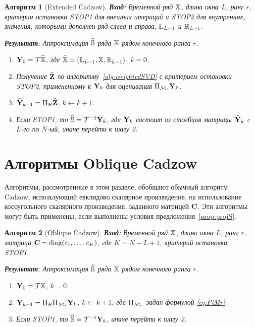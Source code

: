 \documentclass[12pt, specialist, subf,href,colorlinks=true,substylefile = spbu.rtx]{disser}
\newtheorem{algorithm}{Алгоритм}
\theoremstyle{remark}
\theoremstyle{definition}
\begin{document}
\begin{algorithm}[Extended Cadzow] \label{alg:ECIt}
\textbf{Вход}: Временной ряд $\mathbb{X}$, длина окна $L$, ранг $r$,
критерии остановки STOP1 для внешних итераций и STOP2 для внутренних,
значения, которыми дополнен ряд слева и справа, $\mathbb{L}_{L-1}$ и $\mathbb{R}_{L-1}$.

\textbf{Результат}:
Аппроксимация $\widehat{\mathbb{S}}$ ряда $\mathbb{X}$ рядом конечного ранга $r$.

\begin{enumerate}
\item
$\mathbf{Y}_0 = \mathcal{T} \widetilde{\mathbb{X}}$, где $\widetilde{\mathbb{X}}=(\mathbb{L}_{L-1}, \mathbb{X}, \mathbb{R}_{L-1})$, $k=0$.
\item
Получение $\widehat{\mathbf{Z}}$ по алгоритму~\ref{alg:weightedSVD} с критерием остановки STOP2, примененному к $\mathbf{Y}_k$ для оценивания $\Pi_{\mathcal{M}_r} \mathbf{Y}_{k}$.
\item
$\widetilde{\mathbf{Y}}_{k+1} = \Pi_{\mathcal{H}}  \widehat{\mathbf{Z}}$, $k\leftarrow k+1$.
\item
Если STOP1, то $\widehat{\mathbb{S}} = \mathcal{T}^{-1} \mathbf{Y}_k$, где $\mathbf{Y}_k$ состоит из столбцов матрицы $\widetilde{\mathbf{Y}}_{k}$
c $L$-го по $N$-ый, иначе перейти к шагу 2.
\end{enumerate}
\end{algorithm}

\section{Алгоритмы Oblique Cadzow}
\label{sec:ObliqueCadzow}
Алгоритмы, рассмотренные в этом разделе, обобщают обычный алгоритм Cadzow, использующий евклидово скалярное произведение, на использование косоугольного скалярного произведения, заданного матрицей $\mathbf{C}$.
Эти алгоритмы могут быть применены, если выполнены условия предложения~\ref{prop:projS}.

\begin{algorithm}[Oblique Cadzow]
\label{alg:obliqueCadzow}
\textbf{Вход}: Временной ряд $\mathbb{X}$, длина окна $L$, ранг $r$, матрица $\mathbf{C}=\mathop{\mathrm{diag}}(c_1,\ldots, c_K)$, где $K=N-L+1$,
критерий остановки STOP1.

\textbf{Результат}:
Аппроксимация $\widehat{\mathbb{S}}$ ряда $\mathbb{X}$ рядом конечного ранга $r$.

\begin{enumerate}
\item
$\mathbf{Y}_0 = \mathcal{T} \mathbb{X}$, $k=0$.
\item
$\mathbf{Y}_{k+1} = \Pi_{\mathcal{H}}  \Pi_{\mathcal{M}_r} \mathbf{Y}_{k}$, $k\leftarrow k+1$, где
$\Pi_{\mathcal{M}_r}$ задан формулой \eqref{eq:PiMr}.
\item
Если STOP1, то $\widehat{\mathbb{S}} = \mathcal{T}^{-1} \mathbf{Y}_k$, иначе перейти к шагу 2.
\end{enumerate}
\end{algorithm}
\end{document}
